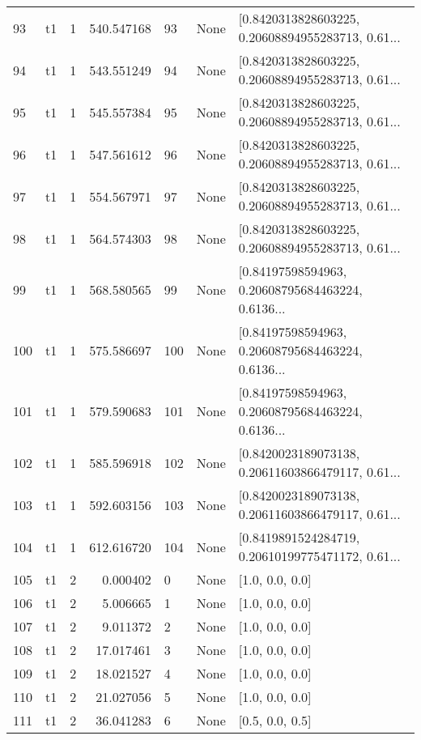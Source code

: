 \begin{tabular}{lllrlll}
93  &  t1 &   1 &  540.547168 &   93 &  None &  [0.8420313828603225, 0.20608894955283713, 0.61... \\
94  &  t1 &   1 &  543.551249 &   94 &  None &  [0.8420313828603225, 0.20608894955283713, 0.61... \\
95  &  t1 &   1 &  545.557384 &   95 &  None &  [0.8420313828603225, 0.20608894955283713, 0.61... \\
96  &  t1 &   1 &  547.561612 &   96 &  None &  [0.8420313828603225, 0.20608894955283713, 0.61... \\
97  &  t1 &   1 &  554.567971 &   97 &  None &  [0.8420313828603225, 0.20608894955283713, 0.61... \\
98  &  t1 &   1 &  564.574303 &   98 &  None &  [0.8420313828603225, 0.20608894955283713, 0.61... \\
99  &  t1 &   1 &  568.580565 &   99 &  None &  [0.84197598594963, 0.20608795684463224, 0.6136... \\
100 &  t1 &   1 &  575.586697 &  100 &  None &  [0.84197598594963, 0.20608795684463224, 0.6136... \\
101 &  t1 &   1 &  579.590683 &  101 &  None &  [0.84197598594963, 0.20608795684463224, 0.6136... \\
102 &  t1 &   1 &  585.596918 &  102 &  None &  [0.8420023189073138, 0.20611603866479117, 0.61... \\
103 &  t1 &   1 &  592.603156 &  103 &  None &  [0.8420023189073138, 0.20611603866479117, 0.61... \\
104 &  t1 &   1 &  612.616720 &  104 &  None &  [0.8419891524284719, 0.20610199775471172, 0.61... \\
105 &  t1 &   2 &    0.000402 &    0 &  None &                                    [1.0, 0.0, 0.0] \\
106 &  t1 &   2 &    5.006665 &    1 &  None &                                    [1.0, 0.0, 0.0] \\
107 &  t1 &   2 &    9.011372 &    2 &  None &                                    [1.0, 0.0, 0.0] \\
108 &  t1 &   2 &   17.017461 &    3 &  None &                                    [1.0, 0.0, 0.0] \\
109 &  t1 &   2 &   18.021527 &    4 &  None &                                    [1.0, 0.0, 0.0] \\
110 &  t1 &   2 &   21.027056 &    5 &  None &                                    [1.0, 0.0, 0.0] \\
111 &  t1 &   2 &   36.041283 &    6 &  None &                                    [0.5, 0.0, 0.5] \\

\end{tabular}
